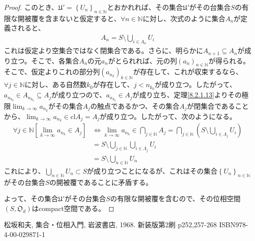 \documentclass[dvipdfmx]{jsarticle}
\begin{document}
\begin{proof}
このとき、$\mathfrak{U}' = \left\{ U_{n} \right\}_{n \in \mathbb{N}}$とおかれれば、その集合$\mathfrak{U}'$がその台集合$S$の有限な開被覆を含まないと仮定すると、$\forall n \in \mathbb{N}$に対し、次式のように集合$A_{n}$が定義されると、
\begin{align*}
A_{n} = S \setminus \bigcup_{i \in \varLambda_{n}} U_{i}
\end{align*}
これは仮定より空集合ではなく閉集合である。さらに、明らかに$A_{n + 1} \subseteq A_{n}$が成り立つ。そこで、各集合$A_{n}$の元$a_{n}$がとられれば、元の列$\left( a_{n} \right)_{n \in \mathbb{N}}$が得られる。そこで、仮定よりこれの部分列$\left( a_{n_{k}} \right)_{k \in \mathbb{N}}$が存在して、これが収束するなら、$\forall j \in \mathbb{N}$に対し、ある自然数$k_{0}$が存在して、$j < n_{k_{0}}$が成り立つ。したがって、$a_{n_{k_{0}}} \in A_{n_{k_{0}}} \subseteq A_{j}$が成り立つので、$a_{n_{k_{0}}} \in A_{j}$が成り立ち、定理\ref{8.2.1.13}よりその極限$\lim_{k \rightarrow \infty}a_{n_{k}}$がその集合$A_{j}$の触点であるかつ、その集合$A_{j}$が閉集合であることから、$\lim_{k \rightarrow \infty}a_{n_{k}} \in {\mathrm{cl}}A_{j} = A_{j}$が成り立つ。したがって、次のようになる。
\begin{align*}
\forall j \in \mathbb{N}\left[ \lim_{k \rightarrow \infty}a_{n_{k}} \in A_{j} \right] &\Leftrightarrow \lim_{k \rightarrow \infty}a_{n_{k}} \in \bigcap_{j \in \mathbb{N}} A_{j} = \bigcap_{j \in \mathbb{N}} \left( S \setminus \bigcup_{i \in \varLambda_{j}} U_{i} \right)\\
&= S \setminus \bigcup_{j \in \mathbb{N}} {\bigcup_{i \in \varLambda_{j}} U_{i}}\\
&= S \setminus \bigcup_{n \in \mathbb{N}} U_{n}
\end{align*}
これにより、$\bigcup_{n \in \mathbb{N}} U_{n} \subset S$が成り立つことになるが、これはその集合$\left\{ U_{n} \right\}_{n \in \mathbb{N}}$がその台集合$S$の開被覆であることに矛盾する。\par
よって、その集合$\mathfrak{U}'$がその台集合$S$の有限な開被覆を含むので、その位相空間$\left( S,\mathfrak{O}_{d} \right)$はcompact空間である。
\end{proof}
\begin{thebibliography}{50}
  松坂和夫, 集合・位相入門, 岩波書店, 1968. 新装版第2刷 p252,257-268 ISBN978-4-00-029871-1
\end{thebibliography}
\end{document}
